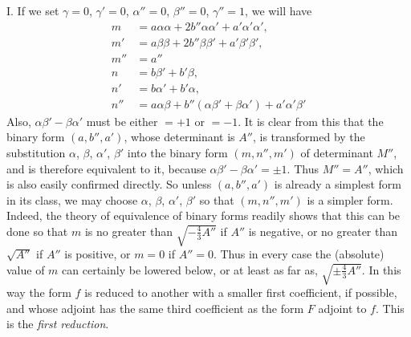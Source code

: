 I. If we set \(\gamma=0\), \(\gamma'=0\), \(\alpha''=0\), \(\beta''=0\), \(\gamma''=1\), we will have
\[
\begin{aligned}
m&=a\alpha\alpha+2b''\alpha\alpha'+a'\alpha'\alpha',\\
m'&=a\beta\beta+2b''\beta\beta'+a'\beta'\beta',\\
m''&=a''\\
n&=b\beta'+b'\beta,\\
n'&=b\alpha'+b'\alpha,\\
n''&=a\alpha\beta+b''(\alpha\beta'+\beta\alpha')+a'\alpha'\beta'
\end{aligned}
\]
Also, \(\alpha\beta'-\beta\alpha'\) must be either \(=+1\) or \(=-1\). It is clear from this that the binary form \((a,b'',a')\), whose determinant is \(A''\), is transformed by the substitution \(\alpha\), \(\beta\), \(\alpha'\), \(\beta'\) into the binary form \((m,n'',m')\) of determinant \(M''\), and is therefore equivalent to it, because \(\alpha\beta'-\beta\alpha'=\pm1\). Thus \(M''=A''\), which is also easily confirmed directly. So unless \((a,b'',a')\) is already a simplest form in its class, we may choose \(\alpha\), \(\beta\), \(\alpha'\), \(\beta'\) so that \((m,n'',m')\) is a simpler form. Indeed, the theory of equivalence of binary forms readily shows that this can be done so that \(m\) is no greater than \(\sqrt{-\frac{4}{3}A''}\) if \(A''\) is negative, or no greater than \(\sqrt{A''}\) if \(A''\) is positive, or \(m=0\) if \(A''=0\). Thus in every case the (absolute) value of \(m\) can certainly be lowered below, or at least as far as, \(\sqrt{\pm\frac{4}{3}A''}\). In this way the form \(f\) is reduced to another with a smaller first coefficient, if possible, and whose adjoint has the same third coefficient as the form \(F\) adjoint to \(f\). This is the \emph{first reduction}.

